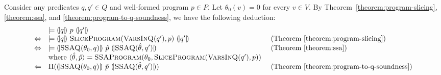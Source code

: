 
Consider any predicates $q, q' \in Q$ and well-formed program $p \in
P$. Let $\theta_0 (v) = 0$ for every $v \in V$. By
Theorem~\ref{theorem:program-slicing}, \ref{theorem:ssa}, and
\ref{theorem:program-to-q-soundness}, we have the following deduction:
\begin{equation*}
  \begin{array}{cll}
    & \models \hoaretriple{q}{p}{q'}\\
    \Leftrightarrow
    & \models 
      \hoaretriple{q}{\textsc{SliceProgram}(\textsc{VarsInQ}(q'), p)}{q'}
    & \textmd{ (Theorem~\ref{theorem:program-slicing})}\\
    \Leftrightarrow
    & \models
      \hoaretriple{\textsc{SSAQ}(\theta_0, q)}
      {\hat{p}}
      {\textsc{SSAQ}(\hat{\theta}, q')}
    & \textmd{ (Theorem~\ref{theorem:ssa})}\\
    &
      \textmd{where } \langle \hat{\theta}, \hat{p} \rangle = 
      \textsc{SSAProgram} (\theta_0, \textsc{SliceProgram}
      (\textsc{VarsInQ}(q'), p))\\
    \Leftarrow
    & \Pi (\hoaretriple{\textsc{SSAQ}(\theta_0, q)}
      {\hat{p}}
      {\textsc{SSAQ}(\hat{\theta}, q')})
    & \textmd{ (Theorem~\ref{theorem:program-to-q-soundness})}
  \end{array}
\end{equation*}